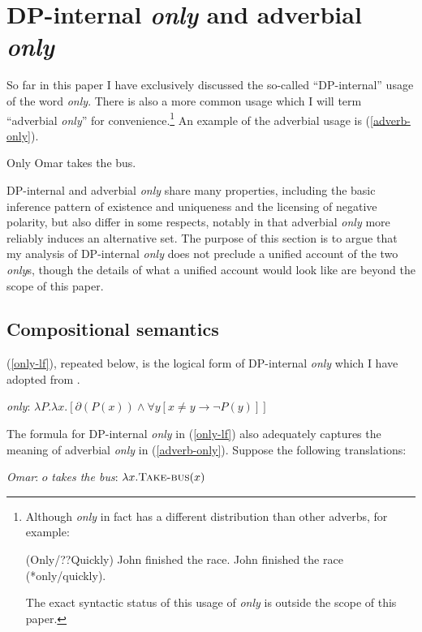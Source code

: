 \section{DP-internal \textit{only} and adverbial \textit{only} \label{sec:two-onlys}}
So far in this paper I have exclusively discussed the so-called ``DP-internal'' usage of the word \textit{only}. There is also a more common usage which I will term ``adverbial \textit{only}'' for convenience.\footnote{Although \textit{only} in fact has a different distribution than other adverbs, for example: \begin{exe} \ex (Only/??Quickly) John finished the race. \ex John finished the race (*only/quickly). \end{exe} The exact syntactic status of this usage of \textit{only} is outside the scope of this paper.} An example of the adverbial usage is (\ref{adverb-only}).

\begin{exe}
	\ex \label{adverb-only} Only Omar takes the bus.
\end{exe}

DP-internal and adverbial \textit{only} share many properties, including the basic inference pattern of existence and uniqueness and the licensing of negative polarity, but also differ in some respects, notably in that adverbial \textit{only} more reliably induces an alternative set. The purpose of this section is to argue that my analysis of DP-internal \textit{only} does not preclude a unified account of the two \textit{only}s, though the details of what a unified account would look like are beyond the scope of this paper.

\subsection{Compositional semantics}
(\ref{only-lf}), repeated below, is the logical form of DP-internal \textit{only} which I have adopted from \citet{cb2015}.

\begin{exe}
	 \textit{only}: $ \lambda P . \lambda x . [ \partial(P(x)) \land \forall y [ x \ne y \to \neg P(y) ] ] $
\end{exe}

The formula for DP-internal \textit{only} in (\ref{only-lf}) also adequately captures the meaning of adverbial \textit{only} in (\ref{adverb-only}). Suppose the following translations:

\begin{exe}
	\ex \textit{Omar}: $o$
	\ex \textit{takes the bus}: $\lambda x . \textsc{Take-bus}(x)$
\end{exe}

